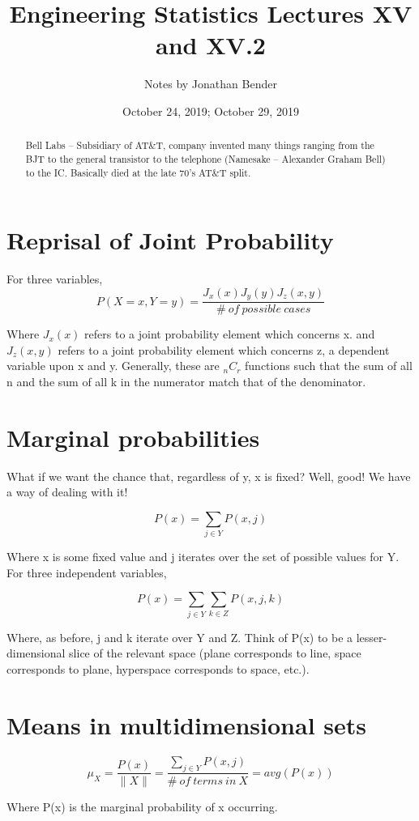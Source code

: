 \documentclass[]{article}
\title{Engineering Statistics Lectures XV and XV.2}
\author{Notes by Jonathan Bender}
\date{October 24, 2019; October 29, 2019}
\begin{document}
	
	\maketitle
	
	\begin{abstract}
		Bell Labs -- Subsidiary of AT\&T, company invented many things ranging from the BJT to the general transistor to the telephone (Namesake -- Alexander Graham Bell) to the IC. Basically died at the late 70's AT\&T split.
	\end{abstract}
	
	\section{Reprisal of Joint Probability}
		For three variables, $$P(X=x, Y=y) = \dfrac{J_x(x)J_y(y)J_z(x,y)}{\#\ of\ possible\ cases}$$
		
		Where $J_x(x)$ refers to a joint probability element which concerns x. and $J_z(x,y)$ refers to a joint probability element which concerns z, a dependent variable upon x and y.
		Generally, these are $_nC_r$ functions such that the sum of all n and the sum of all k in the numerator match that of the denominator.
	
	\section{Marginal probabilities}
		What if we want the chance that, regardless of y, x is fixed?
		Well, good! We have a way of dealing with it!
		
		$$P(x) = \sum_{j \in Y}P(x,j)$$
		
		Where x is some fixed value and j iterates over the set of possible values for Y.
		For three independent variables,
		
		$$P(x) = \sum_{j \in Y}\sum_{k \in Z}P(x,j,k)$$
		
		Where, as before, j and k iterate over Y and Z. Think of P(x) to be a lesser-dimensional slice of the relevant space (plane corresponds to line, space corresponds to plane, hyperspace corresponds to space, etc.).
	
	\section{Means in multidimensional sets}
		$$\mu_X = \frac{P(x)}{\|X\|} = \dfrac{\sum_{j \in Y}P(x,j)}{\#\ of\ terms\ in\ X} = avg(P(x))$$
		
		Where P(x) is the marginal probability of x occurring.
	
\end{document}
